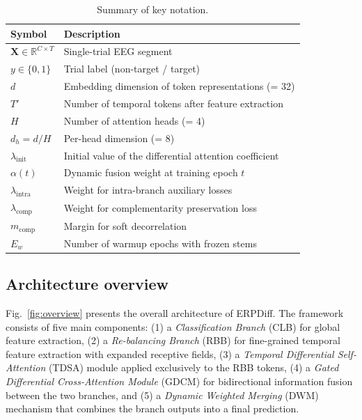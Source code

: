 \begin{table}[t]
\centering
\caption{Summary of key notation.}
\label{tab:notation}
\begin{tabular}{ll}
\toprule
Symbol & Description \\
\midrule
$\mathbf{X} \in \mathbb{R}^{C \times T}$ & Single-trial EEG segment \\
$y \in \{0, 1\}$ & Trial label (non-target / target) \\
$d$ & Embedding dimension of token representations (= 32) \\
$T'$ & Number of temporal tokens after feature extraction \\
$H$ & Number of attention heads (= 4) \\
$d_h = d / H$ & Per-head dimension (= 8) \\
$\lambda_{\text{init}}$ & Initial value of the differential attention coefficient \\
$\alpha(t)$ & Dynamic fusion weight at training epoch $t$ \\
$\lambda_{\text{intra}}$ & Weight for intra-branch auxiliary losses \\
$\lambda_{\text{comp}}$ & Weight for complementarity preservation loss \\
$m_{\text{comp}}$ & Margin for soft decorrelation \\
$E_w$ & Number of warmup epochs with frozen stems \\
\bottomrule
\end{tabular}
\end{table}


\subsection{Architecture overview}\label{sec:overview}

Fig.~\ref{fig:overview} presents the overall architecture of ERPDiff. The framework consists of five main components: (1) a \emph{Classification Branch} (CLB) for global feature extraction, (2) a \emph{Re-balancing Branch} (RBB) for fine-grained temporal feature extraction with expanded receptive fields, (3) a \emph{Temporal Differential Self-Attention} (TDSA) module applied exclusively to the RBB tokens, (4) a \emph{Gated Differential Cross-Attention Module} (GDCM) for bidirectional information fusion between the two branches, and (5) a \emph{Dynamic Weighted Merging} (DWM) mechanism that combines the branch outputs into a final prediction.

